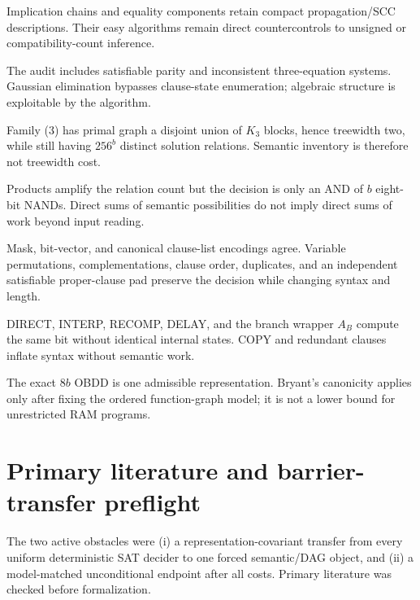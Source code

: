 \documentclass[11pt]{article}
\begin{document}
\begin{description}[leftmargin=3.2cm,style=nextline]
\item[Horn and 2-SAT.]  Implication chains and equality components retain
compact propagation/SCC descriptions.  Their easy algorithms remain direct
countercontrols to unsigned or compatibility-count inference.
\item[Affine/Tseitin.]  The audit includes satisfiable parity and inconsistent
three-equation systems.  Gaussian elimination bypasses clause-state
enumeration; algebraic structure is exploitable by the algorithm.
\item[Bounded treewidth.]  Family (3) has primal graph a disjoint union of
$K_3$ blocks, hence treewidth two, while still having $256^b$ distinct
solution relations.  Semantic inventory is therefore not treewidth cost.
\item[Independent products.]  Products amplify the relation count but the
decision is only an AND of $b$ eight-bit NANDs.  Direct sums of semantic
possibilities do not imply direct sums of work beyond input reading.
\item[Encodings and padding.]  Mask, bit-vector, and canonical clause-list
encodings agree.  Variable permutations, complementations, clause order,
duplicates, and an independent satisfiable proper-clause pad preserve the
decision while changing syntax and length.
\item[Wrappers.]  DIRECT, INTERP, RECOMP, DELAY, and the branch wrapper
$A_B$ compute the same bit without identical internal states.  COPY and
redundant clauses inflate syntax without semantic work.
\item[Compact representations.]  The exact $8b$ OBDD is one admissible
representation.  Bryant's canonicity applies only after fixing the ordered
function-graph model; it is not a lower bound for unrestricted RAM programs.
\end{description}

\section{Primary literature and barrier-transfer preflight}

The two active obstacles were (i) a representation-covariant transfer from
every uniform deterministic SAT decider to one forced semantic/DAG object,
and (ii) a model-matched unconditional endpoint after all costs.  Primary
literature was checked before formalization.
\end{document}
